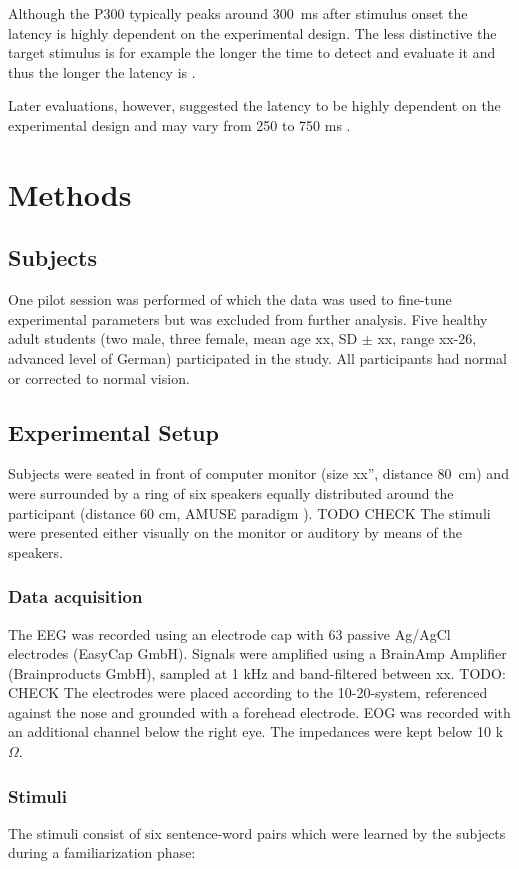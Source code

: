 \documentclass[10pt,letterpaper]{article}
\begin{document}
Although the P300 typically peaks around 300~ms after stimulus onset the latency is highly dependent on the experimental design.
The less distinctive the target stimulus is for example the longer the time to detect and evaluate it and thus the longer the latency is \cite{Polich_2007}.
 
Later evaluations, however, suggested the latency to be highly dependent on the experimental design and may vary from 250 to 750 ms \cite{Wolpaw_2012}.

\section{Methods}

\subsection{Subjects}
One pilot session was performed of which the data was used to fine-tune experimental parameters but was excluded from further analysis.
Five healthy adult students (two male, three female, mean age xx, SD $\pm$ xx, range xx-26, advanced level of German) participated in the study.
All participants had normal or corrected to normal vision.

\subsection{Experimental Setup}
Subjects were seated in front of computer monitor (size xx'', distance 80\ cm) and were surrounded by a ring of six speakers equally distributed around the participant (distance 60 cm, AMUSE paradigm \cite{Schreuder_2010}). TODO CHECK
The stimuli were presented either visually on the monitor or auditory by means of the speakers.
 
\subsubsection{Data acquisition}
The EEG was recorded using an electrode cap with 63 passive Ag/AgCl electrodes (EasyCap GmbH).
Signals were amplified using a BrainAmp Amplifier (Brainproducts GmbH), sampled at 1 kHz and band-filtered between xx. TODO: CHECK
The electrodes were placed according to the 10-20-system, referenced against the nose and grounded with a forehead electrode.
EOG was recorded with an additional channel below the right eye.
The impedances were kept below 10 k$\Omega$.

\subsubsection{Stimuli}
The stimuli consist of six sentence-word pairs which were learned by the subjects during a familiarization phase:
\end{document}
